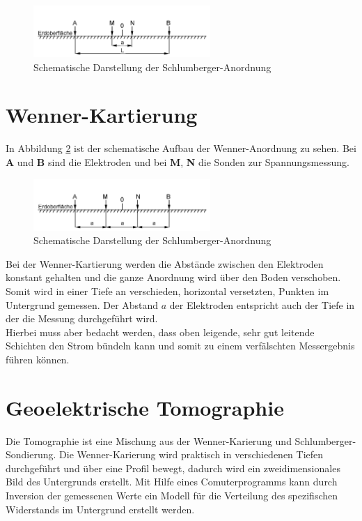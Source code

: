 \begin{figure}[h]
\centering
\includegraphics[width=0.6\textwidth]{Schlumberger.png}
\caption{Schematische Darstellung der Schlumberger-Anordnung}
\label{abb:Schlumberger}
\end{figure}

\section{Wenner-Kartierung}
In Abbildung \ref{abb:Wenner} ist der schematische Aufbau der Wenner-Anordnung zu sehen. Bei \textbf{A} und \textbf{B} sind die Elektroden und bei \textbf{M}, \textbf{N} die Sonden zur Spannungsmessung.

\begin{figure}[h]
\centering
\includegraphics[width=0.6\textwidth]{Wenner.png}
\caption{Schematische Darstellung der Schlumberger-Anordnung}
\label{abb:Wenner}
\end{figure}

Bei der Wenner-Kartierung werden die Abstände zwischen den Elektroden konstant gehalten und die ganze Anordnung wird über den Boden verschoben. Somit wird in einer Tiefe an verschieden, horizontal versetzten, Punkten im Untergrund gemessen. Der Abstand $a$ der Elektroden entspricht auch der Tiefe in der die Messung durchgeführt wird. \\
Hierbei muss aber bedacht werden, dass oben leigende, sehr gut leitende Schichten den Strom bündeln kann und somit zu einem verfälschten Messergebnis führen können.

\section{Geoelektrische Tomographie}
Die Tomographie ist eine Mischung aus der Wenner-Karierung und Schlumberger-Sondierung. Die Wenner-Karierung wird praktisch in verschiedenen Tiefen durchgeführt und über eine Profil bewegt, dadurch wird ein zweidimensionales Bild des Untergrunds erstellt.
Mit Hilfe eines Comuterprogramms kann durch Inversion der gemessenen Werte ein Modell für die Verteilung des spezifischen Widerstands im Untergrund erstellt werden.



